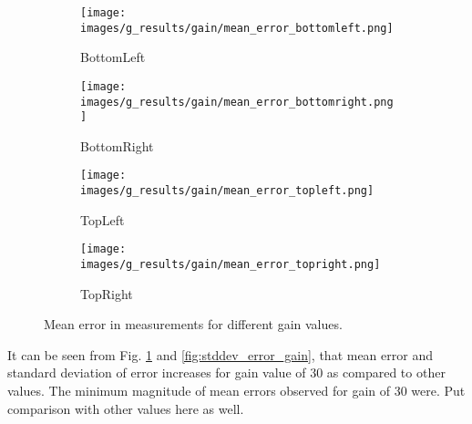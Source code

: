 \begin{figure}[ht]
    \centering
    \begin{subfigure}[b]{0.46\textwidth}
        \centering
        \texttt{[image: images/g\_results/gain/mean\_error\_bottomleft.png]}
        \caption{\textsf{BottomLeft}}
    \end{subfigure}
    \hspace{1cm}
    \begin{subfigure}[b]{0.46\textwidth}
        \centering
        \texttt{[image: images/g\_results/gain/mean\_error\_bottomright.png]}
        \caption{\textsf{BottomRight}}
    \end{subfigure}

    \vspace{5mm}
    
    \begin{subfigure}[b]{0.46\textwidth}
        \centering
        \texttt{[image: images/g\_results/gain/mean\_error\_topleft.png]}
        \caption{\textsf{TopLeft}}
    \end{subfigure}
    \hspace{1cm}
    \begin{subfigure}[b]{0.46\textwidth}
        \centering
        \texttt{[image: images/g\_results/gain/mean\_error\_topright.png]}
        \caption{\textsf{TopRight}}
    \end{subfigure}

    \caption{Mean error in measurements for different gain values.}
    \label{fig:mean_error_gain}
\end{figure}

\noindent It can be seen from Fig. \ref{fig:mean_error_gain} and \ref{fig:stddev_error_gain}, that mean error and standard deviation of error increases for gain value of 30 as compared to other values. The minimum magnitude of mean errors observed for gain of 30 were. Put comparison with other values here as well.

